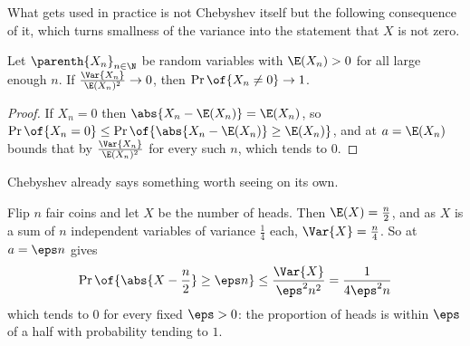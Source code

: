 What gets used in practice is not Chebyshev itself but the following consequence of it, which turns smallness of the variance into the statement that $X$ is not zero.

\begin{boxcorollary} \label{Ch3:Cor:Second_Moment}
    Let $\parenth{X_n}_{n \in \N}$ be random variables with $\E(X_n) > 0$ for all large enough $n$. If $\frac{\Var{X_n}}{\E(X_n)^2} \to 0$, then $\Pr\of{X_n \neq 0} \to 1$.
\end{boxcorollary}
\begin{proof}
    If $X_n = 0$ then $\abs{X_n - \E(X_n)} = \E(X_n)$, so $\Pr\of{X_n = 0} \leq \Pr\of{\abs{X_n - \E(X_n)} \geq \E(X_n)}$, and  at $a = \E(X_n)$ bounds that by $\frac{\Var{X_n}}{\E(X_n)^2}$ for every such $n$, which tends to $0$.
\end{proof}

Chebyshev already says something worth seeing on its own.

\begin{boxexample}
    Flip $n$ fair coins and let $X$ be the number of heads. Then $\E(X) = \frac{n}{2}$, and as $X$ is a sum of $n$ independent variables of variance $\frac{1}{4}$ each, $\Var{X} = \frac{n}{4}$. So  at $a = \eps n$ gives
    \begin{align*}
        \Pr\of{\abs{X - \frac{n}{2}} \geq \eps n} \leq \frac{\Var{X}}{\eps^2 n^2} = \frac{1}{4 \eps^2 n}
    \end{align*}
    which tends to $0$ for every fixed $\eps > 0$: the proportion of heads is within $\eps$ of a half with probability tending to $1$.
\end{boxexample}
